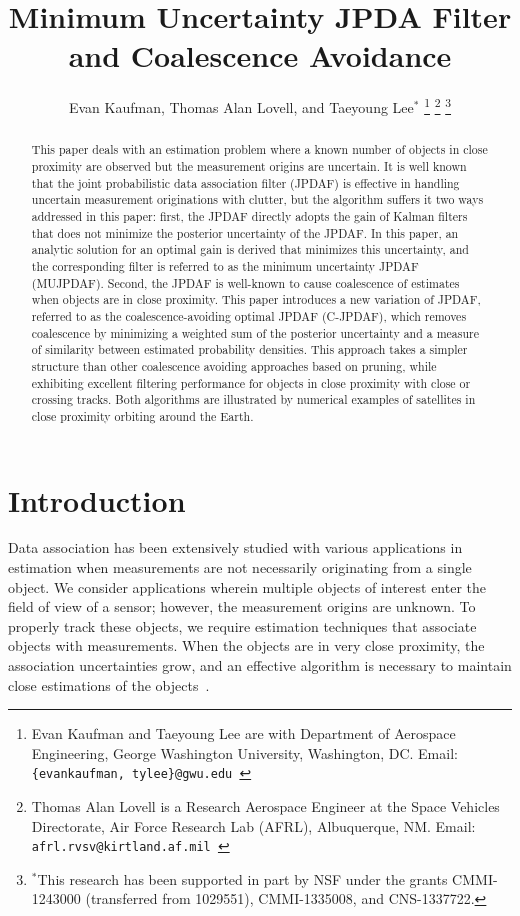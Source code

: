 \documentclass[letterpaper, 10pt, conference]{ieeeconf}
\title{\LARGE \bf
Minimum Uncertainty JPDA Filter and Coalescence Avoidance}
\author{Evan Kaufman, Thomas Alan Lovell, and Taeyoung Lee$^*$
 \thanks{Evan Kaufman and Taeyoung Lee are with Department of Aerospace Engineering, George Washington University, Washington, DC. Email: {\tt\footnotesize \{evankaufman, tylee\}@gwu.edu }}
\thanks{Thomas Alan Lovell is a Research Aerospace Engineer at the Space Vehicles Directorate, Air Force Research Lab (AFRL), Albuquerque, NM. Email: {\tt\footnotesize afrl.rvsv@kirtland.af.mil }}
\thanks{$^*$This research has been supported in part by NSF under the grants CMMI-1243000 (transferred from 1029551), CMMI-1335008, and CNS-1337722.}}
\begin{document}
\allowdisplaybreaks


\maketitle \thispagestyle{empty} \pagestyle{empty}

\begin{abstract}
This paper deals with an estimation problem where a known number of objects in close proximity are observed but the measurement origins are uncertain.
It is well known that the joint probabilistic data association filter (JPDAF) is effective in handling uncertain measurement originations with clutter, but the algorithm suffers it two ways addressed in this paper: first, the JPDAF directly adopts the gain of Kalman filters that does not minimize the posterior uncertainty of the JPDAF.
In this paper, an analytic solution for an optimal gain is derived that minimizes this uncertainty, and the corresponding filter is referred to as the minimum uncertainty JPDAF (MUJPDAF).
Second, the JPDAF is well-known to cause coalescence of estimates when objects are in close proximity.
This paper introduces a new variation of JPDAF, referred to as the coalescence-avoiding optimal JPDAF (C-JPDAF), which removes coalescence by minimizing a weighted sum of the posterior uncertainty and a measure of similarity between estimated probability densities.
This approach takes a simpler structure than other coalescence avoiding approaches based on pruning, while exhibiting excellent filtering performance for objects in close proximity with close or crossing tracks. Both algorithms are illustrated by numerical examples of satellites in close proximity orbiting around the Earth.
\end{abstract}


\section{Introduction}

Data association has been extensively studied with various applications in estimation when measurements are not necessarily originating from a single object.
We consider applications wherein multiple objects of interest enter the field of view of a sensor; however, the measurement origins are unknown.
To properly track these objects, we require estimation techniques that associate objects with measurements.
When the objects are in very close proximity, the association uncertainties grow, and an effective algorithm is necessary to maintain close estimations of the objects~\cite{KauLovLee14}.
\end{document}
